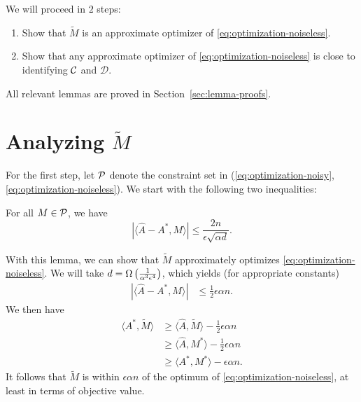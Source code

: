 \documentclass[11pt]{article}
\newcommand{\M}{\tilde{M}}
\newcommand{\A}{\hat{A}}
\newcommand{\Aa}{A^*}
\newcommand{\sD}{\mathcal{D}}
\begin{document}
We will proceed in $2$ steps:
\begin{enumerate}
\item Show that $\M$ is an approximate optimizer of \eqref{eq:optimization-noiseless}.
\item Show that any approximate optimizer of \eqref{eq:optimization-noiseless} is close to identifying $\mathcal{C}$ and $\sD$.
\end{enumerate}
All relevant lemmas are proved in Section~\ref{sec:lemma-proofs}.

\section{Analyzing $\M$}
For the first step, let $\mathcal{P}$ denote the constraint set in (\ref{eq:optimization-noisy},\ref{eq:optimization-noiseless}).
We start with the following two inequalities:
\begin{lemma}
\label{lem:concentration-1}
For all $M \in \mathcal{P}$, we have
\[ |\langle \A-\Aa, M \rangle| \leq \frac{2n}{\epsilon\sqrt{\alpha d}}. \]
\end{lemma}
With this lemma, we can show that $\M$ approximately optimizes \eqref{eq:optimization-noiseless}. 
We will take $d = \Omega\left(\frac{1}{\alpha^3\epsilon^4}\right)$, which yields (for appropriate constants)
\begin{align}
|\langle \A-\Aa, M \rangle| &\leq \frac{1}{2}\epsilon \alpha n.
\end{align}
We then have
\begin{align}
\langle \Aa, \M \rangle  &\geq \langle \A, \M \rangle - \frac{1}{2}\epsilon \alpha n \\
 &\geq \langle \A, M^* \rangle - \frac{1}{2} \epsilon \alpha n \\
 &\geq \langle \Aa, M^* \rangle - \epsilon \alpha n.
\end{align}
It follows that $\M$ is within $\epsilon \alpha n$ of the optimum of \eqref{eq:optimization-noiseless}, 
at least in terms of objective value.
\end{document}
